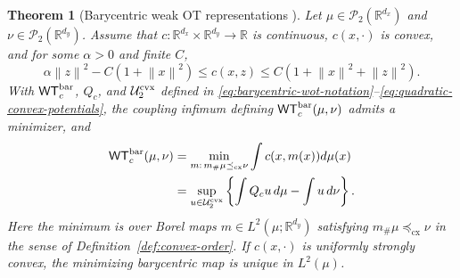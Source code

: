 \documentclass[11pt]{article}
\newcommand{\R}{\mathbb R}
\newcommand{\cP}{\mathcal P}
\newcommand{\norm}[1]{\left\lVert #1\right\rVert}
\newcommand{\cx}{\preceq_{\mathrm{cx}}}
\theoremstyle{plain}
\newtheorem{theorem}{Theorem}[section]
\theoremstyle{definition}
\theoremstyle{remark}
\begin{document}
\begin{theorem}[Barycentric weak OT representations \cite{GRST,BBP}]
\label{thm:wot-blueprint}
Let $\mu\in\cP_2(\R^{d_x})$ and $\nu\in\cP_2(\R^{d_y})$. Assume that
$c:\R^{d_x}\times\R^{d_y}\to\R$ is continuous, $c(x,\cdot)$ is convex, and for
some $\alpha>0$ and finite $C$,
\[
 \alpha\norm z^2-C(1+\norm x^2)
 \le c(x,z)\le C(1+\norm x^2+\norm z^2).
\]
With $\mathsf{WT}_{c}^{\rm bar}$, $Q_c$, and $\mathcal U_2^{\rm cvx}$ defined in
\eqref{eq:barycentric-wot-notation}--\eqref{eq:quadratic-convex-potentials}, the
coupling infimum defining $\mathsf{WT}_{c}^{\rm bar}(\mu,\nu)$ admits a minimizer,
and
\begin{equation}\label{eq:wot-blueprint}
\begin{aligned}
 \mathsf{WT}_{c}^{\rm bar}(\mu,\nu)
 &=\min_{m:\,m_\#\mu\cx\nu}\int c(x,m(x))d\mu(x)\\
 &=\sup_{u\in\mathcal U_2^{\rm cvx}}
   \left\{\int Q_cu\,d\mu-\int u\,d\nu\right\}.
\end{aligned}
\end{equation}
Here the minimum is over Borel maps $m\in L^2(\mu;\R^{d_y})$ satisfying
$m_\#\mu\cx\nu$ in the sense of Definition~\ref{def:convex-order}.
If $c(x,\cdot)$ is uniformly strongly convex, the minimizing barycentric map is
unique in $L^2(\mu)$.
\end{theorem}
\end{document}
